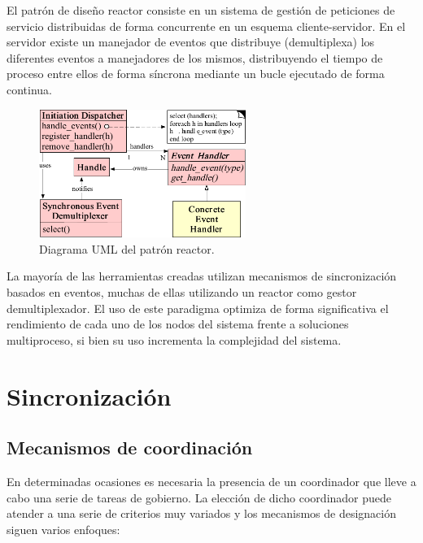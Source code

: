 El patrón de diseño reactor\cite{Coplien95reactor} consiste en un sistema de gestión de peticiones de servicio distribuidas de forma concurrente en un esquema cliente-servidor. En el servidor existe un manejador de eventos que distribuye (demultiplexa) los diferentes eventos a manejadores de los mismos, distribuyendo el tiempo de proceso entre ellos de forma síncrona mediante un bucle ejecutado de forma continua.

\begin{figure}[H]
  \centering
  \includegraphics[width=0.6\textwidth]{Chapter2/Figures/reactoruml}
  \caption[Diagrama UML del patrón reactor]{Diagrama UML del patrón reactor\label{Coplien95reactor}.}
  \label{fig:reactoruml}
\end{figure}



La mayoría de las herramientas creadas utilizan mecanismos de sincronización basados en eventos, muchas de ellas utilizando un reactor como gestor demultiplexador. El uso de este paradigma optimiza de forma significativa el rendimiento de cada uno de los nodos del sistema frente a soluciones multiproceso, si bien su uso incrementa la complejidad del sistema.

\section{Sincronización}

\subsection{Mecanismos de coordinación}

En determinadas ocasiones es necesaria la presencia de un coordinador que lleve a cabo una serie de tareas de gobierno. La elección de dicho coordinador puede atender a una serie de criterios muy variados y los mecanismos de designación siguen varios enfoques:

